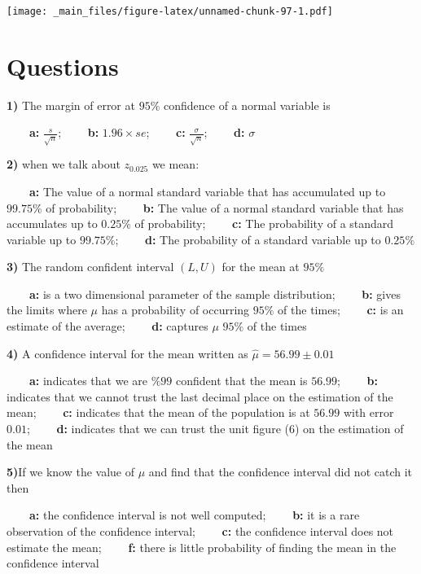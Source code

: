 \documentclass[
]{book}
\begin{document}
\texttt{[image: \_main\_files/figure-latex/unnamed-chunk-97-1.pdf]}

\hypertarget{questions-10}{%
\section{Questions}\label{questions-10}}

\textbf{1)} The margin of error at \(95\%\) confidence of a normal variable is

\textbf{\(\qquad\)a:} \(\frac{s}{\sqrt{n}}\);
\textbf{\(\qquad\)b:} \(1.96\times se\);
\textbf{\(\qquad\)c:} \(\frac{\sigma}{\sqrt{n}}\);
\textbf{\(\qquad\)d:} \(\sigma\)

\textbf{2)} when we talk about \(z_{0.025}\) we mean:

\textbf{\(\qquad\)a:} The value of a normal standard variable that has accumulated up to \(99.75\%\) of probability;
\textbf{\(\qquad\)b:} The value of a normal standard variable that has accumulates up to \(0.25\%\) of probability;
\textbf{\(\qquad\)c:} The probability of a standard variable up to \(99.75\%\);
\textbf{\(\qquad\)d:} The probability of a standard variable up to \(0.25\%\)

\textbf{3)} The random confident interval \((L,U)\) for the mean at \(95\%\)

\textbf{\(\qquad\)a:} is a two dimensional parameter of the sample distribution;
\textbf{\(\qquad\)b:} gives the limits where \(\mu\) has a probability of occurring \(95\%\) of the times;
\textbf{\(\qquad\)c:} is an estimate of the average;
\textbf{\(\qquad\)d:} captures \(\mu\) \(95\%\) of the times

\textbf{4)} A confidence interval for the mean written as \(\hat{\mu}=56.99 \pm 0.01\)

\textbf{\(\qquad\)a:} indicates that we are \(\%99\) confident that the mean is \(56.99\);
\textbf{\(\qquad\)b:} indicates that we cannot trust the last decimal place on the estimation of the mean;
\textbf{\(\qquad\)c:} indicates that the mean of the population is at \(56.99\) with error \(0.01\);
\textbf{\(\qquad\)d:} indicates that we can trust the unit figure (\(6\)) on the estimation of the mean

\textbf{5)}If we know the value of \(\mu\) and find that the confidence interval did not catch it then

\textbf{\(\qquad\)a:} the confidence interval is not well computed;
\textbf{\(\qquad\)b:} it is a rare observation of the confidence interval;
\textbf{\(\qquad\)c:} the confidence interval does not estimate the mean;
\textbf{\(\qquad\)f:} there is little probability of finding the mean in the confidence interval
\end{document}
